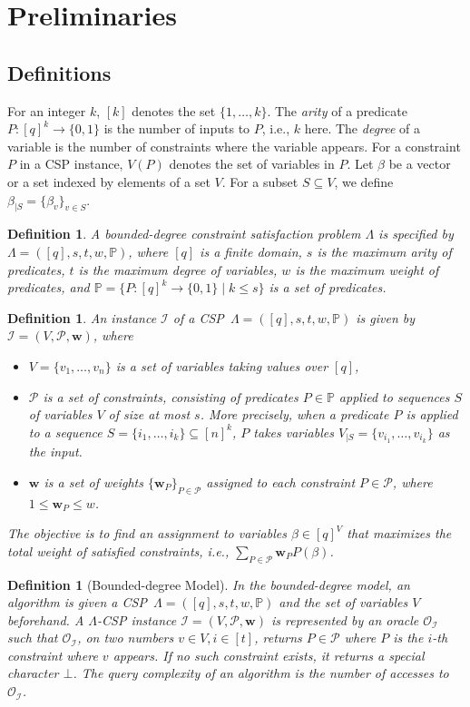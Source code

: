\documentclass[letterpaper, 11pt]{article}
\newtheorem{definition}[theorem]{Definition}
\newcommand{\calI}{\mathcal{I}}
\newcommand{\calO}{\mathcal{O}}
\newcommand{\calP}{\mathcal{P}}
\newcommand{\bbP}{\mathbb{P}}
\newcommand{\biw}{\boldsymbol{w}}
\begin{document}
\section{Preliminaries}\label{sec:pre}
\subsection{Definitions}
For an integer $k$, $[k]$ denotes the set $\{1,\ldots,k\}$.
The \textit{arity} of a predicate $P:[q]^k\to \{0,1\}$ is the number of inputs to $P$, i.e., $k$ here.
The \textit{degree} of a variable is the number of constraints where the variable appears.
For a constraint $P$ in a CSP instance,
$V(P)$ denotes the set of variables in $P$.
Let $\beta$ be a vector or a set indexed by elements of a set $V$.
For a subset $S\subseteq V$,
we define $\beta_{|S}=\{\beta_v\}_{v\in S}$.

\begin{definition}
A \textit{bounded-degree constraint satisfaction problem} $\Lambda$ is specified by $\Lambda=([q],s,t,w,\bbP)$,
where $[q]$ is a finite domain,
$s$ is the maximum arity of predicates,
$t$ is the maximum degree of variables, 
$w$ is the maximum weight of predicates,
and $\bbP=\{P:[q]^k\to \{0,1\} \mid k \leq s\}$ is a set of predicates.
\end{definition}
\begin{definition}
An instance $\calI$ of a CSP~$\Lambda=([q],s,t,w,\bbP)$ is given by $\calI=(V,\calP,\biw)$,
where 
\begin{itemize}
\setlength{\itemsep}{0pt}
\item $V=\{v_1,\ldots,v_n\}$ is a set of variables taking values over $[q]$,
\item $\calP$ is a set of constraints,
  consisting of predicates $P\in \bbP$ applied to sequences $S$ of variables $V$ of size at most $s$.
  More precisely, 
  when a predicate $P$ is applied to a sequence $S=\{i_1,\ldots,i_k\}\subseteq [n]^k$,
  $P$ takes variables $V_{|S}=\{v_{i_1},\ldots,v_{i_k}\}$ as the input. 
\item $\biw$ is a set of weights $\{\biw_P\}_{P\in \calP}$ assigned to each constraint $P\in \calP$, 
  where $1\leq \biw_P\leq w$.
\end{itemize}
The objective is to find an assignment to variables $\beta \in [q]^V$ that maximizes the total weight of satisfied constraints,
i.e., \( \sum_{P\in \calP}\biw_P P(\beta) \).
\end{definition}
\begin{definition}[Bounded-degree Model]
  In \textit{the bounded-degree model},
  an algorithm is given a CSP~$\Lambda = ([q],s,t,w,\bbP)$ and the set of variables $V$ beforehand.
  A $\Lambda$-CSP instance $\calI = (V,\calP,\biw)$ is represented by an oracle $\calO_{\calI}$ such that $\calO_{\calI}$, on two numbers $v \in V, i\in [t]$,
  returns $P \in \calP$ where $P$ is the $i$-th constraint where $v$ appears.
  If no such constraint exists, it returns a special character $\bot$.
  The \textit{query complexity} of an algorithm is the number of accesses to $\calO_{\calI}$.
\end{definition}
\end{document}
